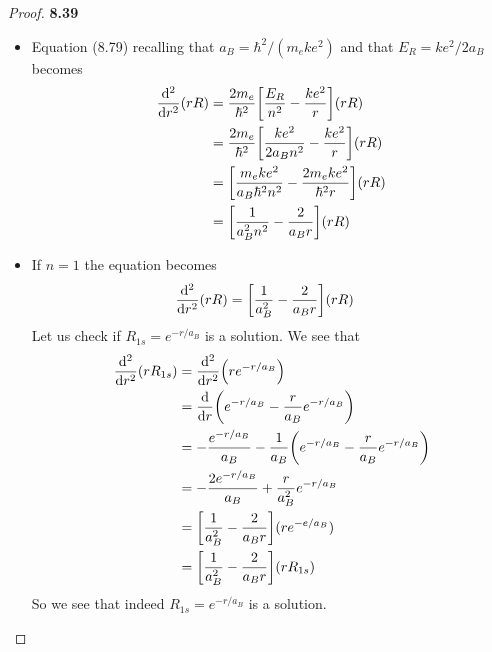 \documentclass[11pt]{article}
\theoremstyle{definition}
\begin{document}
\cleardoublepage
\begin{proof}{\textbf{8.39}}
\begin{itemize}
\item [\textbf{(a)}] Equation (8.79) recalling that $a_B = \hbar^2/(m_eke^2)$ and
that $E_R = ke^2/2a_B$ becomes
\begin{align*}
    \dv[2]{r}(rR)
    &= \frac{2m_e}{\hbar^2}\bigg[\frac{E_R}{n^2} - \frac{ke^2}{r}\bigg](rR)\\
    &= \frac{2m_e}{\hbar^2}\bigg[\frac{ke^2}{2 a_Bn^2} - \frac{ke^2}{r}\bigg](rR)\\
    &= \bigg[\frac{m_e ke^2}{a_B\hbar^2n^2} - \frac{2 m_e ke^2}{\hbar^2 r}\bigg](rR)\\
    &= \bigg[\frac{1}{a_B^2 n^2} - \frac{2}{a_B r}\bigg](rR)
\end{align*}
\item [\textbf{(b)}] If $n = 1$ the equation becomes
\begin{align*}
    \dv[2]{r}(rR)
    &= \bigg[\frac{1}{a_B^2} - \frac{2}{a_B r}\bigg](rR)
\end{align*}
Let us check if $R_{1s} = e^{-r/a_B}$ is a solution. We see that
\begin{align*}
    \dv[2]{r}(rR_{1s}) &= \dv[2]{r}(re^{-r/a_B})\\
    &= \dv{r}(e^{-r/a_B} - \frac{r}{a_B}e^{-r/a_B})\\
    &= -\frac{e^{-r/a_B}}{a_B}
    - \frac{1}{a_B}\bigg(e^{-r/a_B} - \frac{r}{a_B}e^{-r/a_B}\bigg)\\
    &= -\frac{2e^{-r/a_B}}{a_B} + \frac{r}{a_B^2}e^{-r/a_B}\\
    &= \bigg[\frac{1}{a_B^2} -\frac{2}{a_Br}\bigg](re^{-e/a_B})\\
    &= \bigg[\frac{1}{a_B^2} -\frac{2}{a_Br}\bigg](rR_{1s})
\end{align*}
So we see that indeed $R_{1s} = e^{-r/a_B}$ is a solution.
\end{itemize}
\end{proof}
\end{document}
